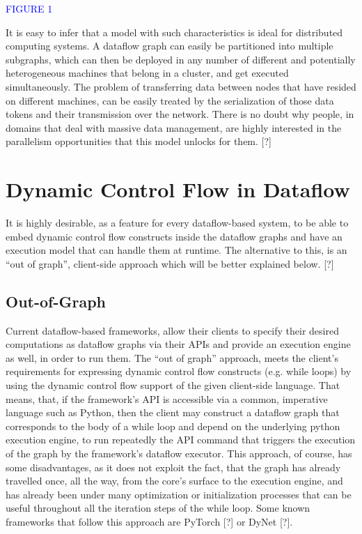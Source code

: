 \documentclass[ack,preface]{dithesis}
\begin{document}
					\textcolor{blue}{FIGURE 1}

It is easy to infer that a model with such characteristics is ideal for distributed computing systems. A dataflow graph can easily be partitioned into multiple subgraphs, which can then be deployed in any number of different and potentially heterogeneous machines that belong in a cluster, and get executed simultaneously. The problem of transferring data between nodes that have resided on different machines, can be easily treated by the serialization of those data tokens and their transmission over the network.
There is no doubt why people, in domains that deal with massive data management, are highly interested in the parallelism opportunities that this model unlocks for them. [?]

    \section{Dynamic Control Flow in Dataflow}
It is highly desirable, as a feature for every dataflow-based system, to be able to embed dynamic control flow constructs inside the dataflow graphs and have an execution model  that  can handle them at runtime. The alternative to this, is an “out of graph”, client-side approach which will be better explained below. [?]

    \subsection{Out-of-Graph}
Current dataflow-based frameworks, allow their clients to specify their desired computations as dataflow graphs via their APIs and provide an execution engine as well, in order to run them. The “out of graph” approach, meets the client’s requirements for expressing dynamic control flow constructs (e.g. while loops) by using the dynamic control flow support of the given client-side language. That means, that, if the framework’s API is accessible via a common, imperative language such as Python, then the client may construct a dataflow graph that corresponds to the body of a while loop and depend on the underlying python execution engine, to run repeatedly the API command that triggers the execution of the graph by the framework’s dataflow executor. This approach, of course, has some disadvantages, as it does not exploit the fact, that the graph has already travelled once, all the way, from the core’s surface to the execution engine, and has already been under many optimization or initialization processes that can be useful throughout all the iteration steps of the while loop.
Some known frameworks that follow this approach are PyTorch [?] or DyNet [?].
\end{document}
